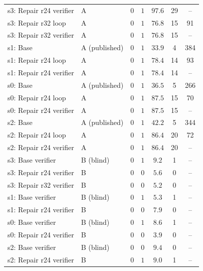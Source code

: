 \documentclass[conference]{IEEEtran}
\begin{document}
\begin{table}[t]
\begin{tabular}{@{}llccccc@{}}
s3: Repair r24 verifier & A & $0$ & $1$ & $97.6$ & 29 & -- \\
s3: Repair r32 loop & A & $0$ & $1$ & $76.8$ & 15 & 91 \\
s3: Repair r32 verifier & A & $0$ & $1$ & $76.8$ & 15 & -- \\
s1: Base & A (published) & $0$ & $1$ & $33.9$ & 4 & 384 \\
s1: Repair r24 loop & A & $0$ & $1$ & $78.4$ & 14 & 93 \\
s1: Repair r24 verifier & A & $0$ & $1$ & $78.4$ & 14 & -- \\
s0: Base & A (published) & $0$ & $1$ & $36.5$ & 5 & 266 \\
s0: Repair r24 loop & A & $0$ & $1$ & $87.5$ & 15 & 70 \\
s0: Repair r24 verifier & A & $0$ & $1$ & $87.5$ & 15 & -- \\
s2: Base & A (published) & $0$ & $1$ & $42.2$ & 5 & 344 \\
s2: Repair r24 loop & A & $0$ & $1$ & $86.4$ & 20 & 72 \\
s2: Repair r24 verifier & A & $0$ & $1$ & $86.4$ & 20 & -- \\
\midrule
s3: Base verifier & B (blind) & $0$ & $1$ & $9.2$ & 1 & -- \\
s3: Repair r24 verifier & B & $0$ & $0$ & $5.6$ & 0 & -- \\
s3: Repair r32 verifier & B & $0$ & $0$ & $5.2$ & 0 & -- \\
s1: Base verifier & B (blind) & $0$ & $1$ & $5.3$ & 1 & -- \\
s1: Repair r24 verifier & B & $0$ & $0$ & $7.9$ & 0 & -- \\
s0: Base verifier & B (blind) & $0$ & $1$ & $8.6$ & 1 & -- \\
s0: Repair r24 verifier & B & $0$ & $0$ & $3.9$ & 0 & -- \\
s2: Base verifier & B (blind) & $0$ & $0$ & $9.4$ & 0 & -- \\
s2: Repair r24 verifier & B & $0$ & $1$ & $9.0$ & 1 & -- \\
\bottomrule
\end{tabular}
\end{table}
\end{document}
